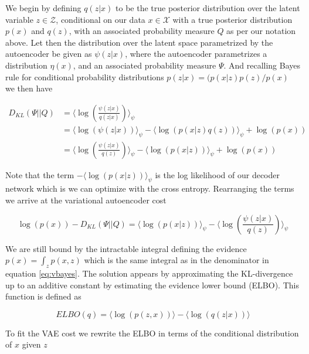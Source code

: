 \noindent We begin by defining $q(z|x)$ to be the true posterior distribution over the latent variable $z \in \mathcal{Z}$, conditional on our data $x \in \mathcal{X}$ with a true posterior distribution $p(x)$ and $q(z)$, with an associated probability measure $Q$ as per our notation above. Let then the distribution over the latent space parametrized by the autoencoder be given as $\psi(z|x)$, where the autoencoder parametrizes a distribution $\eta(x)$, and an associated probability measure $\Psi$. And recalling Bayes rule for conditional probability distributions $p(z | x ) = (p(x | z) p(z) / p(x) $ we then have 

\begin{align}
D_{KL}(\Psi || Q ) &= \langle \log \left(\frac{\psi(z|x)}{q(z|x)}\right) \rangle_\psi \\
&=  \langle \log \left( \psi(z|x)\right) \rangle_\psi - \langle \log \left( p( x | z) q(z) \right) \rangle_\psi + \log \left(p(x) \right) \\
&=  \langle \log \left(\frac{\psi(z|x)}{q(z)} \right) \rangle_\psi - \langle \log \left( p( x | z)\right) \rangle_\psi + \log \left(p(x) \right)
\end{align}

\noindent Note that the term $-\langle \log \left( p( x | z)\right) \rangle_\psi$ is the log likelihood of our decoder network which is we can optimize with the cross entropy. Rearranging the terms we arrive at the variational autoencoder cost

\begin{equation}\label{eq:vae_cost}
\log(p(x)) - D_{KL}(\Psi || Q )=  \langle \log \left( p( x | z)\right) \rangle_\psi - \langle \log \left(\frac{\psi(z|x)}{q(z)}\right)\rangle_\psi
\end{equation}
 

\noindent We are still bound by the intractable integral defining the evidence $p(x) = \int_z p(x, z)$ which is the same integral as in the denominator in equation \ref{eq:vbayes}. The solution appears by approximating the KL-divergence up to an additive constant by estimating the evidence lower bound (ELBO). This function is defined as 

\begin{equation}\label{eq:elbo}
ELBO(q) = \langle \log(p(z, x)) \rangle - \langle \log(q(z|x)) \rangle
\end{equation}

\noindent To fit the VAE cost we rewrite the ELBO in terms of the conditional distribution of $x$ given $z$

